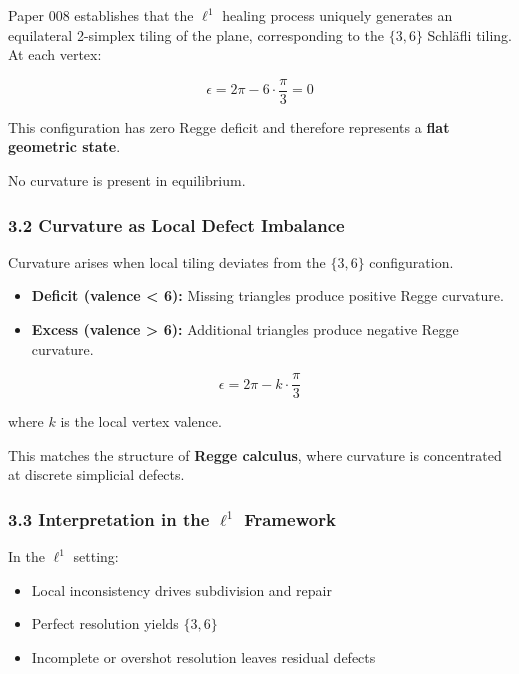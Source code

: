 \documentclass[
]{article}
\providecommand{\tightlist}{%
  \setlength{\itemsep}{0pt}\setlength{\parskip}{0pt}}
\begin{document}
Paper 008 establishes that the \(\ell^1\) healing process uniquely
generates an equilateral 2-simplex tiling of the plane, corresponding to
the \(\{3,6\}\) Schläfli tiling. At each vertex:

\[
\epsilon = 2\pi - 6 \cdot \frac{\pi}{3} = 0
\]

This configuration has zero Regge deficit and therefore represents a
\textbf{flat geometric state}.

No curvature is present in equilibrium.

\subsubsection{3.2 Curvature as Local Defect
Imbalance}\label{curvature-as-local-defect-imbalance}

Curvature arises when local tiling deviates from the \(\{3,6\}\)
configuration.

\begin{itemize}
\item
  \textbf{Deficit (valence \textless{} 6):} Missing triangles produce
  positive Regge curvature.
\item
  \textbf{Excess (valence \textgreater{} 6):} Additional triangles
  produce negative Regge curvature.
\end{itemize}

\[
\epsilon = 2\pi - k \cdot \frac{\pi}{3}
\]

where \(k\) is the local vertex valence.

This matches the structure of \textbf{Regge calculus}, where curvature
is concentrated at discrete simplicial defects.

\subsubsection{\texorpdfstring{3.3 Interpretation in the \(\ell^1\)
Framework}{3.3 Interpretation in the \textbackslash ell\^{}1 Framework}}\label{interpretation-in-the-ell1-framework}

In the \(\ell^1\) setting:

\begin{itemize}
\tightlist
\item
  Local inconsistency drives subdivision and repair
\item
  Perfect resolution yields \(\{3,6\}\)
\item
  Incomplete or overshot resolution leaves residual defects
\end{itemize}
\end{document}
